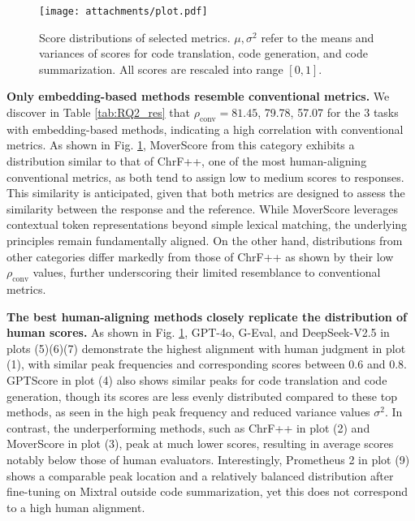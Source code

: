 \begin{figure}
    \centering
    \texttt{[image: attachments/plot.pdf]}
    \vspace{-2.0em}
    \caption{Score distributions of selected metrics. \(\mu,\sigma^2\) refer to the means and variances of scores for code translation, code generation, and code summarization. All scores are rescaled into range \([0, 1]\).}
    \label{fig:plot}
    \vspace{-1.0em}
\end{figure}

\textbf{Only embedding-based methods resemble conventional metrics.} We discover in Table \ref{tab:RQ2_res} that \(\rho_\text{conv}=81.45\), 79.78, 57.07 for the 3 tasks with embedding-based methods, indicating a high correlation with conventional metrics. As shown in Fig. \ref{fig:plot}, MoverScore from this category exhibits a distribution similar to that of ChrF++, one of the most human-aligning conventional metrics, as both tend to assign low to medium scores to responses. This similarity is anticipated, given that both metrics are designed to assess the similarity between the response and the reference. While MoverScore leverages contextual token representations beyond simple lexical matching, the underlying principles remain fundamentally aligned. On the other hand, distributions from other categories differ markedly from those of ChrF++ as shown by their low \(\rho_\text{conv}\) values, further underscoring their limited resemblance to conventional metrics.

\textbf{The best human-aligning methods closely replicate the distribution of human scores.} As shown in Fig. \ref{fig:plot}, GPT-4o, G-Eval, and DeepSeek-V2.5 in plots (5)(6)(7) demonstrate the highest alignment with human judgment in plot (1), with similar peak frequencies and corresponding scores between 0.6 and 0.8. GPTScore in plot (4) also shows similar peaks for code translation and code generation, though its scores are less evenly distributed compared to these top methods, as seen in the high peak frequency and reduced variance values \(\sigma^2\). In contrast, the underperforming methods, such as ChrF++ in plot (2) and MoverScore in plot (3), peak at much lower scores, resulting in average scores notably below those of human evaluators. Interestingly, Prometheus 2 in plot (9) shows a comparable peak location and a relatively balanced distribution after fine-tuning on Mixtral outside code summarization, yet this does not correspond to a high human alignment.

